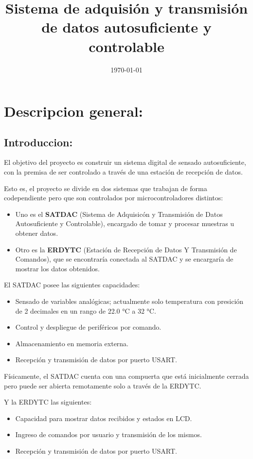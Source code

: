 \documentclass[conference]{IEEEtran}
\date{\today}
\title{Sistema de adquisión y transmisión de datos autosuficiente y controlable}
\begin{document}
\maketitle
\tableofcontents


\section{Descripcion general:}
\label{sec:org1ce7ca9}
\subsection{Introduccion:}
\label{sec:orge68dd2b}
El objetivo del proyecto es construir un sistema digital de sensado autosuficiente, con la premisa de ser controlado a través de una estación de recepción de datos.

Esto es, el proyecto se divide en dos sistemas que trabajan de forma codependiente pero que son controlados por microcontroladores distintos:

\begin{itemize}
\item Uno es el \textbf{SATDAC} (Sistema de Adquisicón y Transmisión de Datos Autosuficiente y Controlable), encargado de tomar y procesar muestras u obtener datos.
\item Otro es la \textbf{ERDYTC} (Estación de Recepción de Datos Y Transmisión de Comandos), que se encontraría conectada al SATDAC y se encargaría de mostrar los datos obtenidos.
\end{itemize}

El SATDAC posee las siguientes capacidades:

\begin{itemize}
\item Sensado de variables analógicas; actualmente solo temperatura con presición de 2 decimales en un rango de 22.0 °C a 32 °C.
\item Control y despliegue de periféricos por comando.
\item Almacenamiento en memoria externa.
\item Recepción y transmisión de datos por puerto USART.
\end{itemize}

Físicamente, el SATDAC cuenta con una compuerta que está inicialmente cerrada pero puede ser abierta remotamente solo a través de la ERDYTC.

Y la ERDYTC las siguientes:

\begin{itemize}
\item Capacidad para mostrar datos recibidos y estados en LCD.
\item Ingreso de comandos por usuario y transmisión de los mismos.
\item Recepción y transmisión de datos por puerto USART.
\end{itemize}
\end{document}
